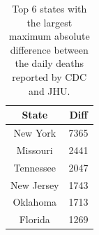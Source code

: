 \documentclass[11pt,twocolumn,letterpaper]{article}
\begin{document}
\begin{table}
    \centering
    \begin{tabular}{cc}
        \toprule
        State & Diff \\
        \midrule
        New York & 7365 \\
        Missouri & 2441 \\
        Tennessee & 2047 \\
        New Jersey & 1743 \\
        Oklahoma & 1713 \\
        Florida & 1269 \\
        \bottomrule
    \end{tabular}
    \caption{Top 6 states with the largest maximum absolute difference between the daily deaths reported by CDC and JHU.}
    \label{table2}
\end{table}
\end{document}

